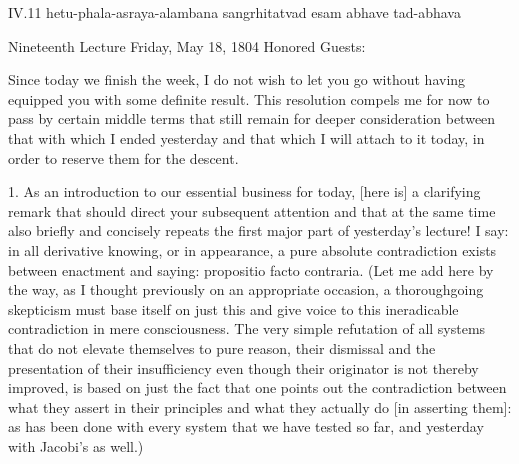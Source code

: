 IV.11
hetu-phala-asraya-alambana sangrhitatvad esam abhave tad-abhava

Nineteenth Lecture
Friday, May 18, 1804
Honored Guests:

Since today we finish the week,
I do not wish to let you go without
having equipped you with some definite result.
This resolution compels me for now to pass by
certain middle terms that still remain
for deeper consideration between
that with which I ended yesterday
and that which I will attach to it today,
in order to reserve them for the descent.

1. As an introduction to our essential business for today,
[here is] a clarifying remark that
should direct your subsequent attention
and that at the same time also briefly and concisely
repeats the first major part of yesterday's lecture!
I say: in all derivative knowing, or in appearance,
a pure absolute contradiction exists
between enactment and saying:
propositio facto contraria.
(Let me add here by the way,
as I thought previously on an appropriate occasion,
a thoroughgoing skepticism must base itself on just this
and give voice to this ineradicable
contradiction in mere consciousness.
The very simple refutation of all systems
that do not elevate themselves to pure reason,
their dismissal and the presentation of their insufficiency
even though their originator is not thereby improved,
is based on just the fact that one points out
the contradiction between what they assert in their principles
and what they actually do [in asserting them]:
as has been done with every system that we have tested so far,
and yesterday with Jacobi's as well.)

